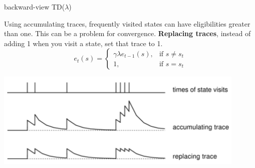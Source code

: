 \documentclass[../main.tex]{subfiles}
\begin{document}
\newline
\begin{algorithm}[H]
    \SetAlgoLined


    \caption{backward-view TD($\lambda$)}
\end{algorithm}
\par
\noindent
Using accumulating traces, frequently visited states can have eligibilities greater than one. This can be a problem for convergence. \textbf{Replacing traces}, instead of adding 1 when you visit a state, set that trace to 1.
\begin{equation}
    e_t(s) =
    \begin{cases}
        \gamma \lambda e_{t-1}(s), & \text{if }s \neq s_t \\
        1,                         & \text{if }s=s_t
    \end{cases}
\end{equation}
\begin{center}
    \includegraphics[width=120mm]{images/EligibilityTracesRepleacing.png}
\end{center}
\newpage
\end{document}
